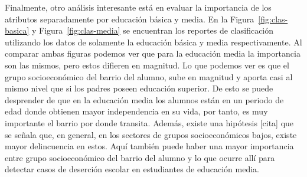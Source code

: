Finalmente, otro análisis interesante está en evaluar la importancia de los atributos separadamente por educación básica y media. En la Figura~\ref{fig:clas-basica} y Figura~\ref{fig:clas-media} se encuentran los reportes de clasificación utilizando los datos de solamente la educación básica y media respectivamente. Al comparar ambas figuras podemos ver que para la educación media la importancia son las mismos, pero estos difieren en magnitud. Lo que podemos ver es que el grupo socioeconómico del barrio del alumno, sube en magnitud y aporta casi al mismo nivel que si los padres poseen educación superior. De esto se puede desprender de que en la educación media los alumnos están en un periodo de edad donde obtienen mayor independencia en su vida, por tanto, es muy importante el barrio por donde transita. Además, existe una hipótesis [cita] que se señala que, en general, en los sectores de grupos socioeconómicos bajos, existe mayor delincuencia en estos. Aquí también puede haber una mayor importancia entre grupo socioeconómico del barrio del alumno y lo que ocurre allí para detectar casos de deserción escolar en estudiantes de educación media.

